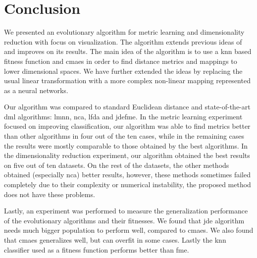 \documentclass[12pt,a4paper]{report}
\begin{document}








\chapter*{Conclusion} \label{chap:conclusion}

We presented an evolutionary algorithm for metric learning and dimensionality reduction with focus on visualization. The algorithm extends previous ideas of \citep{fukui2013evolutionary} and improves on its results. The main idea of the algorithm is to use a \ac{knn} based fitness function and \ac{cmaes} in order to find distance metrics and mappings to lower dimensional spaces. We have further extended the ideas by replacing the usual linear transformation with a more complex non-linear mapping represented as a neural networks.

Our algorithm was compared to standard Euclidean distance and state-of-the-art \acl{dml} algorithms: \ac{lmnn}, \ac{nca}, \ac{lfda} and \ac{jdefme}. In the metric learning experiment focused on improving classification, our algorithm was able to find metrics better than other algorithms in four out of the ten cases, while in the remaining cases the results were mostly comparable to those obtained by the best algorithms. In the dimensionality reduction experiment, our algorithm obtained the best results on five out of ten datasets. On the rest of the datasets, the other methods obtained (especially \ac{nca}) better results, however, these methods sometimes failed completely due to their complexity or numerical instability, the proposed method does not have these problems.

Lastly, an experiment was performed to measure the generalization performance of the evolutionary algorithms and their fitnesses. We found that \ac{jde} algorithm needs much bigger population to perform well, compared to \ac{cmaes}. We also found that \ac{cmaes} generalizes well, but can overfit in some cases. Lastly the \ac{knn} classifier used as a fitness function performs better than \acl{fme}.
\end{document}
